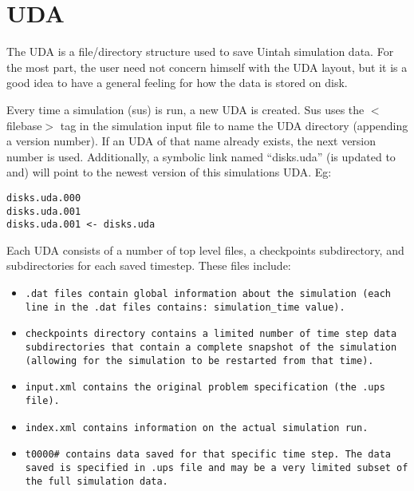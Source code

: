 \section{UDA}


The UDA is a file/directory structure used to save Uintah simulation
data.  For the most part, the user need not concern himself with the
UDA layout, but it is a good idea to have a general feeling for how
the data is stored on disk.


Every time a simulation (sus) is run, a new UDA is created.  Sus uses
the $<$filebase$>$ tag in the simulation input file to name the UDA
directory (appending a version number).  If an UDA of that name
already exists, the next version number is used.  Additionally, a
symbolic link named ``disks.uda'' (is updated to and) will point to
the newest version of this simulations UDA.  Eg:

\begin{Verbatim}[fontsize=\footnotesize]
disks.uda.000
disks.uda.001
disks.uda.001 <- disks.uda
\end{Verbatim}


Each UDA consists of a number of top level files, a checkpoints
subdirectory, and subdirectories for each saved timestep.  These files
include:

\begin{itemize}

\item \tt.dat \normalfont files contain global information about the
  simulation (each line in the .dat files contains: simulation\_time
  value).
\item \tt checkpoints \normalfont directory contains a limited
  number of time step data subdirectories that contain a complete
  snapshot of the simulation (allowing for the simulation to be
  restarted from that time).
\item \tt input.xml \normalfont contains the original problem
  specification (the .ups file).
\item \tt index.xml \normalfont contains information on the actual
  simulation run.
\item \tt t0000\# \normalfont contains data saved for that specific
  time step.  The data saved is specified in .ups file and may be a
  very limited subset of the full simulation data.

\end{itemize}

